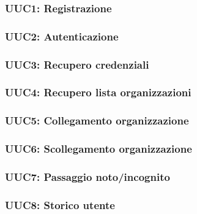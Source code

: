 \documentclass[../analisi-dei-requisiti.tex]{subfiles}
\begin{document}
\subsubsection{UUC1: Registrazione}%
\label{subs:UUC1}



\subsubsection{UUC2: Autenticazione}%
\label{subs:UUC2}



\subsubsection{UUC3: Recupero credenziali}%
\label{subs:UUC3}



\subsubsection{UUC4: Recupero lista organizzazioni}%
\label{subs:UUC4}



\subsubsection{UUC5: Collegamento organizzazione}%
\label{subs:UUC5}



\subsubsection{UUC6: Scollegamento organizzazione}%
\label{subs:UUC6}



\subsubsection{UUC7: Passaggio noto/incognito}%
\label{subs:UUC7}



\subsubsection{UUC8: Storico utente}%
\label{subs:UUC8}
\end{document}
